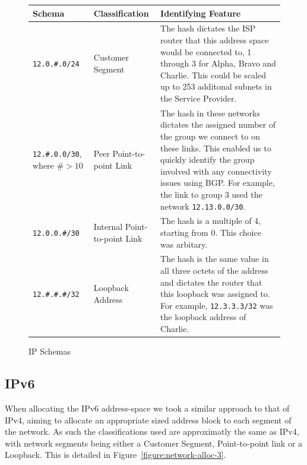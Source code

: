 \begin{figure}[!ht]
    \caption{IP Schemas}
    \label{figure:network-alloc-2}
    \centering
    \begin{tabular}{|p{3cm}|p{3cm}|p{5cm}|}

        \hline
        \textbf{Schema} & \textbf{Classification} & \textbf{Identifying Feature} \\

        \hline
        \texttt{12.0.\#.0/24} & Customer Segment & The hash dictates the ISP
        router that this address space would be connected to, 1 through 3 for
        Alpha, Bravo and Charlie. This could be scaled up to 253 additonal
        subnets in the Service Provider.\\
        \hline
        \texttt{12.\#.0.0/30}, where $\#> 10$ & Peer Point-to-point Link &
        The hash in these networks dictates the assigned number of the group we
        connect to on these links. This enabled us to quickly identify the
        group involved with any connectivity issues using BGP. For example, the
        link to group 3 used the network \texttt{12.13.0.0/30}.\\
        \hline
        \texttt{12.0.0.\#/30} & Internal Point-to-point Link &
        The hash is a multiple of 4, starting from 0. This choice was
        arbitary.\\
        \hline
        \texttt{12.\#.\#.\#/32} & Loopback Address & The hash is
        the same value in all three octets of the address and dictates the
        router that this loopback was assigned to. For example,
        \texttt{12.3.3.3/32} was the loopback address of Charlie.\\

        \hline
    \end{tabular}
\end{figure}

\clearpage

\subsection{IPv6}
When allocating the IPv6 address-space we took a similar approach to that of
IPv4, aiming to allocate an appropriate sized address block to each segment of
the network. As such the classifications used are approximatly the same as
IPv4, with network segments being either a Customer Segment, Point-to-point
link or a Loopback. This is detailed in Figure~\ref{figure:network-alloc-3}.

